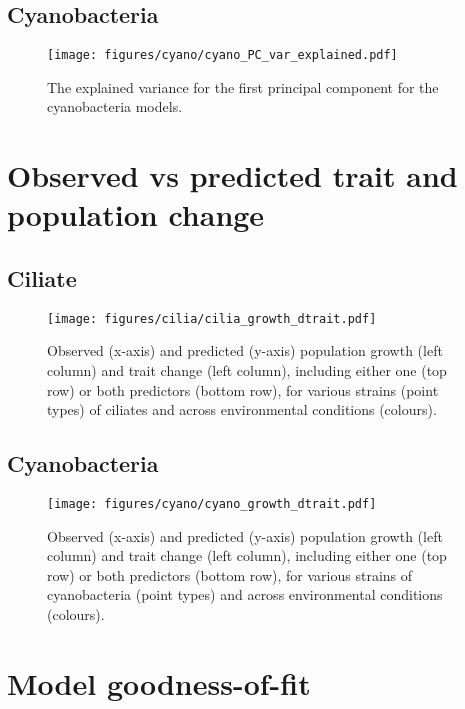 \subsection{Cyanobacteria}

\begin{figure}[H]
    \centering
    \texttt{[image: figures/cyano/cyano\_PC\_var\_explained.pdf]}
    \caption{The explained variance for the first principal component for the cyanobacteria models.}
    \label{fig:cyano_PC_var_explained}
\end{figure}

\section{Observed vs predicted trait and population change}

\subsection{Ciliate}

\begin{figure}[H]
    \centering
    \texttt{[image: figures/cilia/cilia\_growth\_dtrait.pdf]}
    \caption{Observed (x-axis) and predicted (y-axis) population growth (left column) and trait change (left column), including either one (top row) or both predictors (bottom row), for various strains (point types) of ciliates and across environmental conditions (colours).}
    \label{fig:cilia_growth_dtrait}
\end{figure}

\subsection{Cyanobacteria}

\begin{figure}[H]
    \centering
    \texttt{[image: figures/cyano/cyano\_growth\_dtrait.pdf]}
    \caption{Observed (x-axis) and predicted (y-axis) population growth (left column) and trait change (left column), including either one (top row) or both predictors (bottom row), for various strains of cyanobacteria (point types) and across environmental conditions (colours).}
    \label{fig:cyano_growth_dtrait}
\end{figure}

\section{Model goodness-of-fit}

